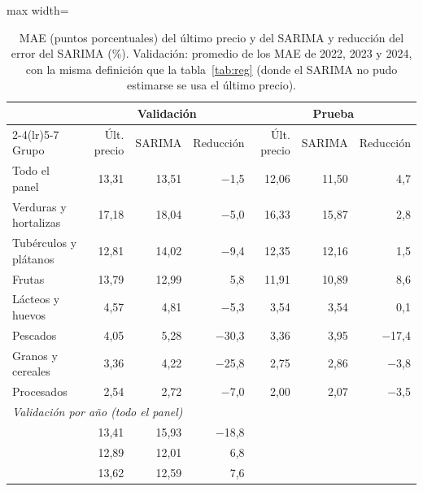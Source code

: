 \begin{table}[htbp]\centering\small
\caption{MAE (puntos porcentuales) del último precio y del SARIMA y reducción del error del SARIMA (\%). Validación: promedio de los MAE de 2022, 2023 y 2024, con la misma definición que la tabla~\ref{tab:reg} (donde el SARIMA no pudo estimarse se usa el último precio).}\label{tab:sarima_error}
\begin{adjustbox}{max width=\textwidth}\begin{tabular}{lrrrrrr}\toprule
& \multicolumn{3}{c}{Validación} & \multicolumn{3}{c}{Prueba}\\ \cmidrule(lr){2-4}\cmidrule(lr){5-7}
Grupo & Últ. precio & SARIMA & Reducción & Últ. precio & SARIMA & Reducción\\ \midrule
Todo el panel & 13{,}31 & 13{,}51 & \ensuremath{-}1{,}5 & 12{,}06 & 11{,}50 & 4{,}7 \\ \midrule
Verduras y hortalizas & 17{,}18 & 18{,}04 & \ensuremath{-}5{,}0 & 16{,}33 & 15{,}87 & 2{,}8 \\
Tubérculos y plátanos & 12{,}81 & 14{,}02 & \ensuremath{-}9{,}4 & 12{,}35 & 12{,}16 & 1{,}5 \\
Frutas & 13{,}79 & 12{,}99 & 5{,}8 & 11{,}91 & 10{,}89 & 8{,}6 \\
Lácteos y huevos & 4{,}57 & 4{,}81 & \ensuremath{-}5{,}3 & 3{,}54 & 3{,}54 & 0{,}1 \\
Pescados & 4{,}05 & 5{,}28 & \ensuremath{-}30{,}3 & 3{,}36 & 3{,}95 & \ensuremath{-}17{,}4 \\
Granos y cereales & 3{,}36 & 4{,}22 & \ensuremath{-}25{,}8 & 2{,}75 & 2{,}86 & \ensuremath{-}3{,}8 \\
Procesados & 2{,}54 & 2{,}72 & \ensuremath{-}7{,}0 & 2{,}00 & 2{,}07 & \ensuremath{-}3{,}5 \\
\midrule \multicolumn{7}{l}{\emph{Validación por año (todo el panel)}}\\
\quad 2022 & 13{,}41 & 15{,}93 & \ensuremath{-}18{,}8 & & & \\
\quad 2023 & 12{,}89 & 12{,}01 & 6{,}8 & & & \\
\quad 2024 & 13{,}62 & 12{,}59 & 7{,}6 & & & \\
\bottomrule\end{tabular}\end{adjustbox}\end{table}
